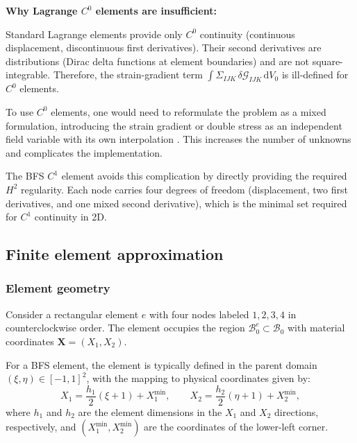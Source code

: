 \documentclass[11pt]{article}
\newcommand{\bX}{\mathbf{X}}
\newcommand{\bX}{\mathbf{X}}
\begin{document}
\textbf{Why Lagrange $C^{0}$ elements are insufficient:}

Standard Lagrange elements provide only $C^{0}$ continuity (continuous
displacement, discontinuous first derivatives). Their second derivatives
are distributions (Dirac delta functions at element boundaries) and are
not square-integrable. Therefore, the strain-gradient term
$\int\Sigma_{IJK}\,\delta\mathcal{G}_{IJK}\,\mathrm{d}V_{0}$ is
ill-defined for $C^{0}$ elements.

To use $C^{0}$ elements, one would need to reformulate the problem as a
mixed formulation, introducing the strain gradient or double stress as
an independent field variable with its own interpolation
\cite{AmanatidouAravas2002}. This increases the number of unknowns and
complicates the implementation.

The BFS $C^{1}$ element avoids this complication by directly providing
the required $H^{2}$ regularity. Each node carries four degrees of
freedom (displacement, two first derivatives, and one mixed second
derivative), which is the minimal set required for $C^{1}$ continuity
in 2D.

\subsection{Finite element approximation}
\label{ssec:fe_approx}

\subsubsection{Element geometry}

Consider a rectangular element $e$ with four nodes labeled $1,2,3,4$ in
counterclockwise order. The element occupies the region
$\mathcal{B}_{0}^{e}\subset\mathcal{B}_{0}$ with material coordinates
$\bX=(X_{1},X_{2})$.

For a BFS element, the element is typically defined in the parent
domain $(\xi,\eta)\in[-1,1]^{2}$, with the mapping to physical
coordinates given by:
\begin{equation}
X_{1} = \frac{h_{1}}{2}(\xi+1) + X_{1}^{\min},
\qquad
X_{2} = \frac{h_{2}}{2}(\eta+1) + X_{2}^{\min},
\end{equation}
where $h_{1}$ and $h_{2}$ are the element dimensions in the $X_{1}$ and
$X_{2}$ directions, respectively, and $(X_{1}^{\min},X_{2}^{\min})$ are
the coordinates of the lower-left corner.
\end{document}
